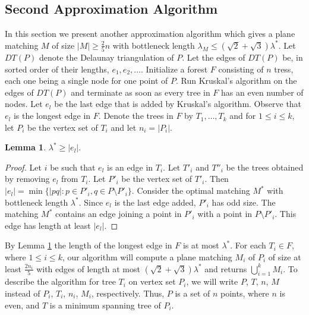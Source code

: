 \documentclass[11pt,a4paper]{article}
\newcommand{\bt}{\lambda}
\newcommand{\btopt}{\lambda^*}
\newtheorem{lemma}{Lemma}
\begin{document}
\subsection{Second Approximation Algorithm}
\label{bottleneck-five-over-four}

In this section we present another approximation algorithm which gives a plane matching $M$ of size $|M|\ge\frac{2}{5}n$ with bottleneck length $\bt_M\le(\sqrt{2}+\sqrt{3})\btopt$. Let $DT(P)$ denote the Delaunay triangulation of $P$. Let the edges of $DT(P)$ be, in sorted order of their lengths, $e_1, e_2, \dots$. Initialize a forest $F$ consisting of $n$ tress, each one being a single node for one point of $P$. Run Kruskal's algorithm on the edges of $DT(P)$ and terminate as soon as every tree in $F$ has an even number of nodes. Let $e_l$ be the last edge that is added by Kruskal's algorithm. Observe that $e_l$ is the longest edge in $F$. Denote the trees in $F$ by $T_1 ,\dots, T_k$ and for $1\le i \le k$, let $P_i$ be the vertex set of $T_i$ and let $n_i=|P_i|$. 

\begin{lemma}
\label{longest-edge}
 $\btopt \ge |e_l|.$
\end{lemma}
\begin{proof}
Let $i$ be such that $e_l$ is an edge in $T_i$. Let $T'_i$ and $T''_i$ be the trees obtained by removing $e_l$ from $T_i$. Let $P'_i$ be the vertex set of $T'_i$. Then $|e_l|=\min \{|pq|: p \in P'_i, q\in P\setminus P'_i\}$. Consider the optimal matching $M^*$ with bottleneck length $\btopt$. Since $e_l$ is the last edge added, $P'_i$ has odd size. The matching $M^*$ contains an edge joining a point in $P'_i$ with a point in $P\setminus P'_i$. This edge has length at least $|e_l|$.
\end{proof}

By Lemma \ref{longest-edge} the length of the longest edge in $F$ is at most $\btopt$. For each $T_i\in F$, where $1\le i\le k$, our algorithm will compute a plane matching $M_i$ of $P_i$ of size at least $\frac{2n_i}{5}$ with edges of length at most $(\sqrt{2}+\sqrt{3})\btopt$ and returns $\bigcup_{i=1}^{k} M_i$. To describe the algorithm for tree $T_i$ on vertex set $P_i$, we will write $P$, $T$, $n$, $M$ instead of $P_i$, $T_i$, $n_i$, $M_i$, respectively. Thus, $P$ is a set of $n$ points, where $n$ is even, and $T$ is a minimum spanning tree of $P_i$.
\end{document}

